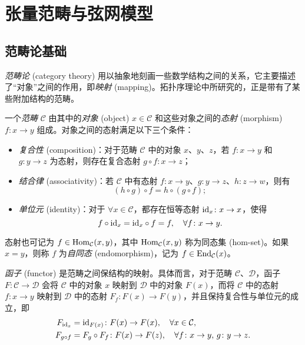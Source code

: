 \chapter{张量范畴与弦网模型}

\section{范畴论基础}

\emph{范畴论} (category theory) 用以抽象地刻画一些数学结构之间的关系，它主要描述了“对象”之间的作用，即\emph{映射} (mapping)。拓扑序理论中所研究的，正是带有了某些附加结构的范畴。

一个\emph{范畴} $\mathcal{C}$ 由其中的\emph{对象} (object) $x\in\mathcal{C}$ 和这些对象之间的\emph{态射} (morphism) $f\colon x\to y$ 组成。对象之间的态射满足以下三个条件：
\begin{itemize}
  \item \emph{复合性} (composition)：对于范畴 $\mathcal{C}$ 中的对象 $x$、$y$、$z$，若 $f\colon x\to y$ 和 $g\colon y\to z$ 为态射，则存在复合态射 $g\circ f\colon x\to z$；
  \item \emph{结合律} (associativity)：若 $\mathcal{C}$ 中有态射 $f\colon x\to y$、$g\colon y\to z$、$h\colon z\to w$，则有
    \begin{equation}
      (h\circ g)\circ f = h\circ (g\circ f);
    \end{equation}
  \item \emph{单位元} (identity)：对于 $\forall x\in\mathcal{C}$，都存在恒等态射 $\mathrm{id}_x\colon x\to x$，使得
    \begin{equation}
      f \circ \mathrm{id}_x = \mathrm{id}_x \circ f = f, \quad \forall f\colon x\to y.
    \end{equation}
\end{itemize}
态射也可记为 $f\in\operatorname{Hom}_{\mathcal{C}}(x,y)$，其中 $\operatorname{Hom}_{\mathcal{C}}(x,y)$ 称为同态集 (hom-set)。如果 $x=y$，则称 $f$ 为\emph{自同态} (endomorphism)，记为 $f\in\operatorname{End}_{\mathcal{C}}(x)$。

\emph{函子} (functor) 是范畴之间保结构的映射。具体而言，对于范畴 $\mathcal{C}$、$\mathcal{D}$，函子 $F\colon\mathcal{C}\to\mathcal{D}$ 会将 $\mathcal{C}$ 中的对象 $x$ 映射到 $\mathcal{D}$ 中的对象 $F(x)$，而将 $\mathcal{C}$ 中的态射 $f\colon x\to y$ 映射到 $\mathcal{D}$ 中的态射 $F_f\colon F(x)\to F(y)$，并且保持复合性与单位元的成立，即
\begin{align}
  F_{\mathrm{id}_x} &= \mathrm{id}_{F(x)} \colon F(x) \to F(x), \quad \forall x\in\mathcal{C}, \\
  F_{g\circ f} &= F_g \circ F_f \colon F(x) \to F(z), \quad \forall f\colon x\to y, \, g\colon y\to z.
\end{align}

